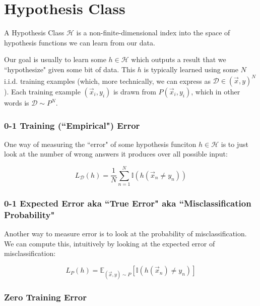 \documentclass[fleqn]{article}
\begin{document}


\section*{Hypothesis Class}

A Hypothesis Class $\mathcal{H}$ is a non-finite-dimensional index into the space of hypothesis functions we can learn from our data.

Our goal is usually to learn some $h \in \mathcal{H}$ which outputs a result that we ``hypothesize" given some bit of data. This $h$ is typically learned using some $N$ i.i.d. training examples (which, more technically, we can express as $\mathcal{D} \in (\vec{x}, y)^N$). Each training example $(\vec{x}_i, y_i)$ is drawn from $P(\vec{x}_i,y_i)$, which in other words is $\mathcal{D} \sim P^N$.

\subsubsection*{0-1 Training (``Empirical") Error}

One way of measuring the ``error" of some hypothesis funciton $h \in \mathcal{H}$ is to just look at the number of wrong answers it produces over all possible input:

\begin{equation*}
L_{\mathcal{D}}(h) = \frac{1}{N} \sum_{n=1}^N \mathbb{I}(h(\vec{x}_n \neq y_n))
\end{equation*}

\subsubsection*{0-1 Expected Error aka ``True Error" aka ``Misclassification Probability"}

Another way to measure error is to look at the probability of misclassification. We can compute this, intuitively by looking at the expected error of misclassification:

\begin{equation*}
L_P(h) = \mathbb{E}_{(\vec{x}, y) \sim P}[\mathbb{I}(h(\vec{x}_n) \neq y_n)]
\end{equation*}

\subsubsection*{Zero Training Error}
\end{document}
